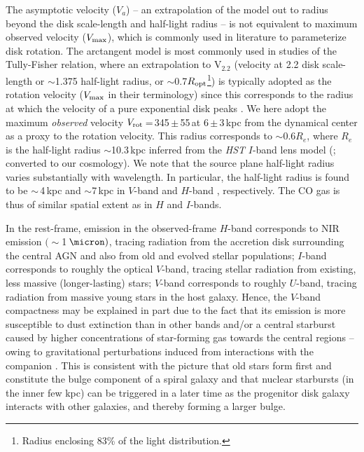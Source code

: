 \documentclass[]{emulateapj}
\begin{document}
The asymptotic velocity ($V_{a}$) -- an extrapolation of the model
out to radius beyond the disk scale-length and half-light radius --
is not equivalent to maximum observed velocity ($V_{\rm max}$),
which is commonly used in literature to parameterize disk rotation.
The arctangent model is most commonly used in studies of the
Tully-Fisher relation, where an extrapolation to V$_{2.2}$ (velocity
at 2.2 disk scale-length or $\sim$1.375 half-light radius,
or $\sim$0.7$R_{\rm opt}$\footnote{Radius enclosing 83\% of the light
distribution.}) is typically adopted
as the rotation velocity ($V_{\rm max}$ in their
terminology) since this corresponds to the radius at which the velocity
of a pure exponential disk peaks \citep{Courteau97b}.
We here adopt the maximum {\em observed} velocity
$V_{\rm rot}$\,=\,345\,$\pm$\,55\,\kms at 6\,$\pm$\,3\,kpc from the %
dynamical center as a proxy to the rotation velocity.
This radius corresponds to $\sim$0.6$R_e$, where $R_e$ is the half-light
radius $\sim$10.3\,kpc inferred from the {\it HST} $I$-band
lens model (; converted to
our cosmology).
We note that the source plane half-light radius varies substantially with
wavelength. In particular, the half-light radius is found to be
$\sim$\,4\,kpc and $\sim$7\,kpc in $V$-band
 and $H$-band , respectively.
The CO gas is thus of similar spatial
extent as in $H$ and $I$-bands.

In the rest-frame,
emission in the observed-frame $H$-band corresponds to NIR emission $(\sim$1\,$\micron)$,
tracing radiation from the accretion disk surrounding
the central AGN and also from old and evolved stellar populations;
$I$-band corresponds to roughly the optical $V$-band, tracing stellar radiation from
existing, less massive (\ie longer-lasting) stars;
$V$-band corresponds to roughly $U$-band,  tracing radiation from massive young stars
in the host galaxy. Hence,
the $V$-band compactness may be explained in part
due to the fact that its emission is
more susceptible to dust extinction than in other bands and/or
a central starburst caused by higher
concentrations of star-forming gas towards the central regions -- owing to
gravitational perturbations induced
from interactions with the companion
\citep[\eg][]{DiMatteo05a}.
This is consistent with the picture that old stars form first and constitute the bulge component
of a spiral galaxy and that nuclear starbursts (in the inner few kpc) can be triggered 
in a later time as the progenitor disk galaxy interacts with other galaxies, 
and thereby forming a larger bulge.
\end{document}
